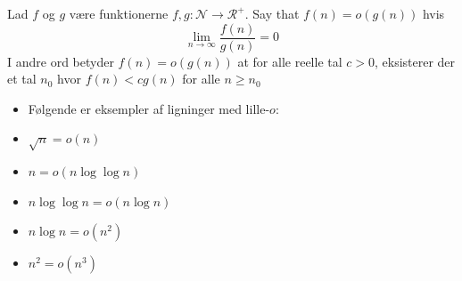 \begin{frame}[allowframebreaks]
	\begin{definition}
		Lad $f$ og $g$ være funktionerne $f, g : \mathcal{N} \rightarrow \mathcal{R}^{+}$. Say that $f(n) = o(g(n))$ hvis
		\begin{equation*}
			\lim_{n \rightarrow \infty} \frac{f(n)}{g(n)} = 0
		\end{equation*}
		I andre ord betyder $f(n) = o(g(n))$ at for alle reelle tal $c > 0$, eksisterer der et tal $n_{0}$ hvor $f(n) < cg(n)$ for alle $n \ge n_{0}$
	\end{definition}

	\begin{itemize}
		\item Følgende er eksempler af ligninger med lille-$o$:
		\item $\sqrt{n} = o(n)$
		\item $n = o(n \log \log n)$
		\item $n \log \log n = o(n \log n)$
		\item $n \log n = o(n^{2})$
		\item $n^{2} = o(n^{3})$
	\end{itemize}
\end{frame}

